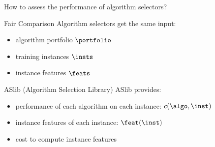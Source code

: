 \begin{frame}[c]{How to assess the performance of algorithm selectors?}

\begin{block}{Fair Comparison}
Algorithm selectors get the same input:
\begin{itemize}
  \item algorithm portfolio $\portfolio$
  \item training instances $\insts$
  \item instance features $\feats$
\end{itemize}
\end{block}

\begin{block}{ASlib (Algorithm Selection Library)}
ASlib provides:
\begin{itemize}
  \item performance of each algorithm on each instance: $c(\algo,\inst)$
  \item instance features of each instance: $\feat(\inst)$
  \item cost to compute instance features
\end{itemize}
\end{block}

\end{frame}
